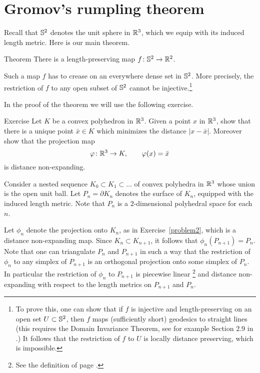 \chapter{Gromov's rumpling theorem}\label{sec:S^2->R^2}

Recall that $\mathbb{S}^2$ denotes the unit sphere in $\mathbb{R}^3$, which we equip with its induced length metric.  Here is our main theorem.

\begin{thm}{Theorem}\label{thm:S2->R2}
There is a length-preserving map $f\colon\mathbb{S}^2\to\mathbb{R}^2$.
\end{thm}

Such a map $f$ has to crease on an everywhere dense set in $\mathbb{S}^2$.
More precisely,  the restriction of $f$ to any open subset of $\mathbb{S}^2$ cannot be injective.\footnote{To prove this, one can show that if $f$ is injective and length-preserving on an open set $U \subset \mathbb{S}^2$, then $f$ maps (sufficiently short) geodesics to straight lines (this requires the Domain Invariance Theorem, 
see for example Section 2.9 in \cite{alexandrov}.)  It follows that the restriction of $f$ to $U$ is locally distance preserving, which is impossible.
}

In the proof of the theorem we will use the following exercise. %

\begin{thm}{Exercise}\label{problem2}
Let $K$ be a convex polyhedron in $\mathbb{R}^3$.
Given a point $x$ in $\mathbb{R}^3$, show that there is a unique point $\bar x\in K$ which minimizes the distance $|x-\bar x|$.
Moreover show that the projection map $$\varphi\colon \mathbb{R}^3 \to K, \qquad \varphi(x) = \bar x$$ is distance non-expanding.
\end{thm}

Consider a nested
sequence $K_0\subset K_1\subset \dots$ of convex polyhedra in $\mathbb{R}^3$ whose union is the open unit ball.
Let $P_n = \partial K_n$ denotes the surface of $K_n$, equipped with the induced length metric.
Note that $P_n$ is a $2$-dimensional polyhedral space for each $n$.

Let $\phi_n$ denote the projection onto $K_{n}$, 
as in Exercise~\ref{problem2}, which is a distance non-expanding map.
Since $K_{n} \subset K_{n+1}$, it follows that $\phi_n(P_{n+1}) = P_{n}$.
Note that one can triangulate $P_n$ and $P_{n+1}$ in such a way that the restriction of $\phi_n$ to any simplex of $P_{n+1}$ is an orthogonal projection onto some simplex of $P_{n}$.
In particular the restriction of $\phi_n$ to $P_{n+1}$ is piecewise linear%
\footnote{See the definition of page \pageref{page:piecewise linear map}.}
and distance non-expanding with respect to the length metrics on $P_{n+1}$ and $P_n$.



